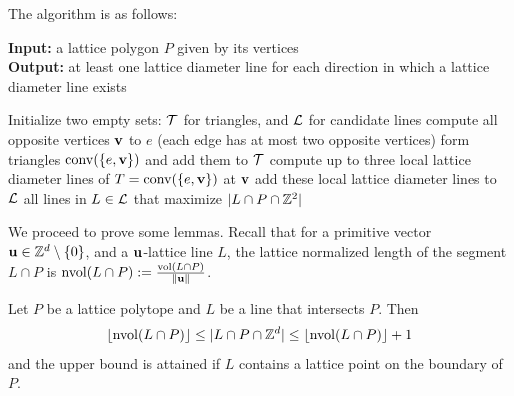 The algorithm is as follows:

\begin{algorithm}[ht!]
\caption{\textsc{Computing Lattice Diameter Lines}}
\textbf{Input:} a lattice polygon $P$ given by its vertices \\
\textbf{Output:} at least one lattice diameter line for each direction in which a lattice diameter line exists
\begin{algorithmic}[1]
\State Initialize two empty sets: $\mathcal{T}$ for triangles, and $\mathcal{L}$ for candidate lines
    \State compute all opposite vertices $\mathbf{v}$ to $e$ (each edge has at most two opposite vertices)
    \State form triangles $\operatorname{conv}(\{e,\mathbf{v}\})$ and add them to $\mathcal{T}$
\EndFor
{}
    \State compute up to three local lattice diameter lines of $T=\operatorname{conv}(\{e,\mathbf{v}\})$ at $\mathbf{v}$
    \State add these local lattice diameter lines to $\mathcal{L}$
\EndFor
\State \Return all lines in $L \in \mathcal{L}$ that maximize $|L \cap P \cap \mathbb{Z}^2|$
\end{algorithmic}
\end{algorithm}

We proceed to prove some lemmas. Recall that for a primitive vector $\mathbf{u} \in \mathbb{Z}^d\setminus \{0\}$, and a $\mathbf{u}$-lattice line $L$, the lattice normalized length of the segment $L \cap P$ is $\operatorname{nvol}(L \cap P) := \frac{\operatorname{vol}(L \cap P)}{\|\mathbf{u}\|}$.

\begin{lemma}\label{lem:nvol}
    Let $P$ be a lattice polytope and $L$ be a line that intersects $P$. Then
    \begin{align*}
    \left \lfloor \operatorname{nvol}(L \cap P) \right \rfloor \leq |L \cap P \cap \mathbb{Z}^d| \leq  \left \lfloor \operatorname{nvol}(L \cap P) \right \rfloor + 1
    \end{align*}
and the upper bound is attained if $L$ contains a lattice point on the boundary of $P$.
\end{lemma}

    
